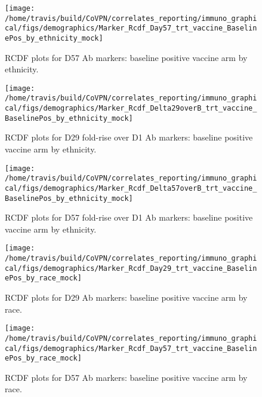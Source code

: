 \documentclass[]{book}
\theoremstyle{definition}
\theoremstyle{definition}
\theoremstyle{definition}
\newcommand{\1}{\mathbbm{1}}
\begin{document}
\begin{figure}[H]

{\centering \texttt{[image: /home/travis/build/CoVPN/correlates\_reporting/immuno\_graphical/figs/demographics/Marker\_Rcdf\_Day57\_trt\_vaccine\_BaselinePos\_by\_ethnicity\_mock]} 

}

\caption{RCDF plots for D57 Ab markers: baseline positive vaccine arm by ethnicity.}\label{fig:unnamed-chunk-113}
\end{figure}

\begin{figure}[H]

{\centering \texttt{[image: /home/travis/build/CoVPN/correlates\_reporting/immuno\_graphical/figs/demographics/Marker\_Rcdf\_Delta29overB\_trt\_vaccine\_BaselinePos\_by\_ethnicity\_mock]} 

}

\caption{RCDF plots for D29 fold-rise over D1 Ab markers: baseline positive vaccine arm by ethnicity.}\label{fig:unnamed-chunk-114}
\end{figure}

\begin{figure}[H]

{\centering \texttt{[image: /home/travis/build/CoVPN/correlates\_reporting/immuno\_graphical/figs/demographics/Marker\_Rcdf\_Delta57overB\_trt\_vaccine\_BaselinePos\_by\_ethnicity\_mock]} 

}

\caption{RCDF plots for D57 fold-rise over D1 Ab markers: baseline positive vaccine arm by ethnicity.}\label{fig:unnamed-chunk-115}
\end{figure}

\begin{figure}[H]

{\centering \texttt{[image: /home/travis/build/CoVPN/correlates\_reporting/immuno\_graphical/figs/demographics/Marker\_Rcdf\_Day29\_trt\_vaccine\_BaselinePos\_by\_race\_mock]} 

}

\caption{RCDF plots for D29 Ab markers: baseline positive vaccine arm by race.}\label{fig:unnamed-chunk-116}
\end{figure}

\begin{figure}[H]

{\centering \texttt{[image: /home/travis/build/CoVPN/correlates\_reporting/immuno\_graphical/figs/demographics/Marker\_Rcdf\_Day57\_trt\_vaccine\_BaselinePos\_by\_race\_mock]} 

}

\caption{RCDF plots for D57 Ab markers: baseline positive vaccine arm by race.}\label{fig:unnamed-chunk-117}
\end{figure}
\end{document}
